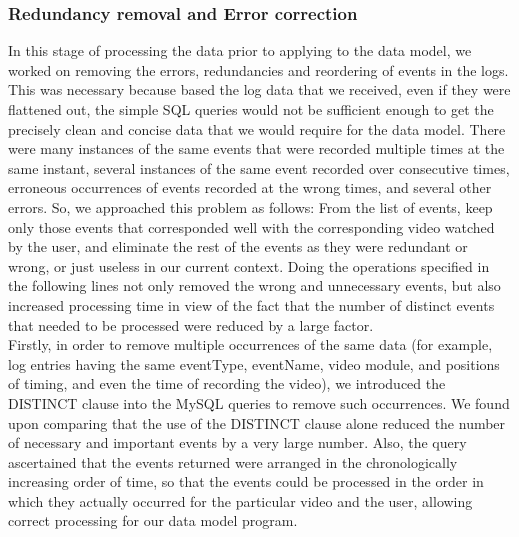 \documentclass[16pt]{report}
\begin{document}
\subsubsection{Redundancy removal and Error correction}


In this stage of processing the data prior to applying to the data model, we worked on removing the errors, redundancies and reordering of events in the logs. This was necessary because based the log data that we received, even if they were flattened out, the simple SQL queries would not be sufficient enough to get the precisely clean and concise data that we would require for the data model. There were many instances of the same events that were recorded multiple times at the same instant, several instances of the same event recorded over consecutive times, erroneous occurrences of events recorded at the wrong times, and several other errors. So, we approached this problem as follows: From the list of events, keep only those events that corresponded well with the corresponding video watched by the user, and eliminate the rest of the events as they were redundant or wrong, or just useless in our current context. Doing the operations specified in the following lines not only removed the wrong and unnecessary events, but also increased processing time in view of the fact that the number of distinct events that needed to be processed were reduced by a large factor.\\


Firstly, in order to remove multiple occurrences of the same data (for example, log entries having the same eventType, eventName, video module, and positions of timing, and even the time of recording the video), we introduced the DISTINCT clause into the MySQL queries to remove such occurrences. We found upon comparing that the use of the DISTINCT clause alone reduced the number of necessary and important events by a very large number. Also, the query ascertained that the events returned were arranged in the chronologically increasing order of time, so that the events could be processed in the order in which they actually occurred for the particular video and the user, allowing correct processing for our data model program.\\
\end{document}
